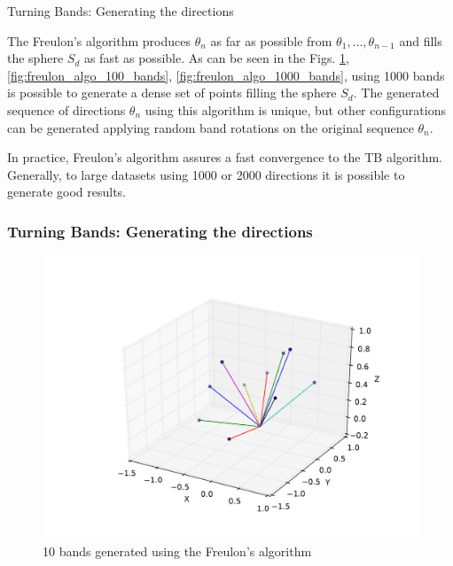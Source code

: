 \begin{frame}{Turning Bands: Generating the directions}

The Freulon's algorithm produces $\theta_n$ as far as possible from $\theta_1, ... , \theta_{n-1}$ and fills the sphere $S_d$ as
fast as possible. As can be seen in the Figs. \ref{fig:freulon_algo_10_bands}, \ref{fig:freulon_algo_100_bands}, 
\ref{fig:freulon_algo_1000_bands}, using 1000 bands is possible to generate a dense set of points filling the sphere $S_d$. The generated sequence of directions $\theta_n$ using this algorithm is unique, but other configurations can be generated applying random band rotations on the original sequence $\theta_n$. 

In practice, Freulon's algorithm assures a fast convergence to the TB algorithm. Generally, to large datasets using 1000 or 2000 directions
it is possible to generate good results. 
\end{frame}


\begin{frame}
\frametitle{Turning Bands: Generating the directions}
\begin{figure}
\begin{center}
\includegraphics[height=0.7\textheight]{figs/freulon_algo_10_bands.pdf}
\end{center}
\caption{10 bands generated using the Freulon's algorithm}
\label{fig:freulon_algo_10_bands}
\end{figure}
\end{frame}


